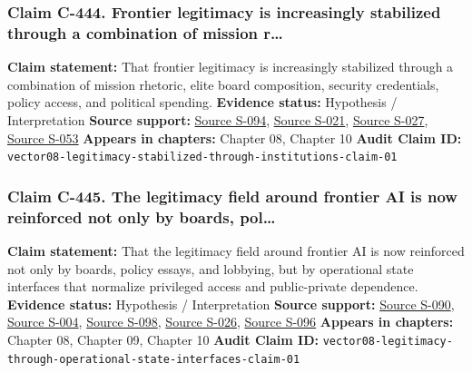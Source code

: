 \documentclass[
  american,
  11pt,
  letterpaper,
]{article}
\begin{document}
\subsubsection{Claim C-444. Frontier legitimacy is increasingly
stabilized through a combination of mission
r\ldots{}}\label{claim-c-444-frontier-legitimacy-is-increasingly-stabilized-through-a-combination-of-mission-r}

\textbf{Claim statement:} That frontier legitimacy is increasingly
stabilized through a combination of mission rhetoric, elite board
composition, security credentials, policy access, and political
spending. \textbf{Evidence status:} Hypothesis / Interpretation
\textbf{Source support:}
\hyperref[source-s-094-openai-announces-new-members-to-board-of-directors]{Source
S-094},
\hyperref[source-s-021-openai-appoints-former-top-us-cyberwarrior-paul-nakasone-to-its-board-of-directors]{Source
S-021},
\hyperref[source-s-027-anthropic-outspends-openai-in-biggest-ever-lobbying-quarter]{Source
S-027},
\hyperref[source-s-053-leading-the-future-committee-overview]{Source
S-053} \textbf{Appears in chapters:} Chapter 08, Chapter 10
\textbf{Audit Claim ID:}
\texttt{vector08-legitimacy-stabilized-through-institutions-claim-01}

\subsubsection{Claim C-445. The legitimacy field around frontier AI is
now reinforced not only by boards,
pol\ldots{}}\label{claim-c-445-the-legitimacy-field-around-frontier-ai-is-now-reinforced-not-only-by-boards-pol}

\textbf{Claim statement:} That the legitimacy field around frontier AI
is now reinforced not only by boards, policy essays, and lobbying, but
by operational state interfaces that normalize privileged access and
public-private dependence. \textbf{Evidence status:} Hypothesis /
Interpretation \textbf{Source support:}
\hyperref[source-s-090-introducing-openai-for-government]{Source S-090},
\hyperref[source-s-004-claude-gov-models-for-u-s-national-security-customers]{Source
S-004},
\hyperref[source-s-098-anthropic-and-palantir-partner-to-bring-claude-ai-models-to-aws-for-u-s-government-intelligence-and-defense-operations]{Source
S-098},
\hyperref[source-s-026-army-launches-detachment-201-executive-innovation-corps-to-drive-tech-transformation]{Source
S-026},
\hyperref[source-s-096-openais-proposals-for-the-us-ai-action-plan]{Source
S-096} \textbf{Appears in chapters:} Chapter 08, Chapter 09, Chapter 10
\textbf{Audit Claim ID:}
\texttt{vector08-legitimacy-through-operational-state-interfaces-claim-01}
\end{document}
